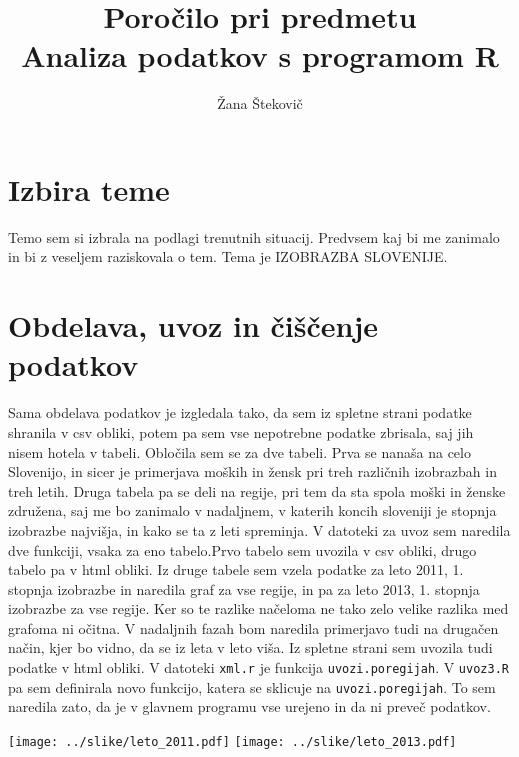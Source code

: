 \documentclass[11pt,a4paper]{article}
\begin{document}
\title{Poročilo pri predmetu \\
Analiza podatkov s programom R}
\author{Žana Štekovič}
\maketitle

\section{Izbira teme}
Temo sem si izbrala na podlagi trenutnih situacij. Predvsem kaj bi me zanimalo in bi z veseljem raziskovala o tem.
Tema je IZOBRAZBA SLOVENIJE.

\section{Obdelava, uvoz in čiščenje podatkov}
Sama obdelava podatkov je izgledala tako, da sem iz spletne strani podatke shranila v csv obliki, potem pa sem vse nepotrebne podatke zbrisala, saj jih nisem hotela v tabeli.
Obločila sem se za dve tabeli. Prva se nanaša na celo Slovenijo, in sicer je primerjava moških in žensk pri treh različnih izobrazbah in treh letih.
Druga tabela pa se deli na regije, pri tem da sta spola moški in ženske združena, saj me bo zanimalo v nadaljnem, v katerih koncih sloveniji je stopnja izobrazbe najvišja, in kako se ta z leti spreminja.
V datoteki za uvoz sem naredila dve funkciji, vsaka za eno tabelo.Prvo tabelo sem uvozila v csv obliki, drugo tabelo pa v html obliki. Iz druge tabele sem vzela podatke za leto 2011, 1. stopnja izobrazbe in naredila graf za vse regije, in pa za leto 2013, 1. stopnja izobrazbe za vse regije. Ker so te razlike načeloma ne tako zelo velike razlika med grafoma ni očitna.
V nadaljnih fazah bom naredila primerjavo tudi na drugačen način, kjer bo vidno, da se iz leta v leto viša.  Iz spletne strani sem uvozila tudi podatke v html obliki. V datoteki \verb|xml.r| je funkcija \verb|uvozi.poregijah|. V \verb|uvoz3.R| pa sem definirala novo funkcijo, katera se sklicuje na \verb|uvozi.poregijah|. To sem naredila zato, da je v glavnem programu vse urejeno in da ni preveč podatkov.

\texttt{[image: ../slike/leto\_2011.pdf]}
\texttt{[image: ../slike/leto\_2013.pdf]}
\end{document}
